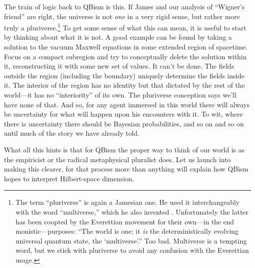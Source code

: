 \documentclass[aps,pra,superscriptaddress,10pt,tightenlines,twocolumn,nofootinbib]{revtex4}
\begin{document}
The train of logic back to QBism is this.  If James and our analysis of ``Wigner's friend'' are right, the universe is not {\it one\/} in a very rigid sense, but rather more truly a pluriverse.\footnote{The term ``pluriverse'' is again a Jamesian one.  He used it interchangeably with the word ``multiverse,'' which he also invented \cite{JamesMultiverse}.  Unfortunately the latter has been coopted by the Everettian movement for their own---in the end monistic---purposes:  ``The world is one; it {\it is\/} the deterministically evolving universal quantum state, the `multiverse'.'' Too bad.  Multiverse is a tempting word, but we stick with pluriverse to avoid any confusion with the Everettian usage.}  To get some sense of what this can mean, it is useful to start by thinking about what it is not.  A good example can be found by taking a solution to the vacuum Maxwell equations in some extended region of spacetime.  Focus on a compact subregion and try to conceptually delete the solution within it, reconstructing it with some new set of values.  It can't be done.  The fields outside the region (including the boundary) uniquely determine the fields inside it.  The interior of the region has no identity but that dictated by the rest of the world---it has no ``interiority'' of its own.  The pluriverse conception says we'll have none of that.  And so, for any agent immersed in this world there will always be uncertainty for what will happen upon his encounters with it.  To wit, where there is uncertainty there should be Bayesian probabilities, and so on and so on until much of the story we have already told.

What all this hints is that for QBism the proper way to think of our world is as the empiricist or the radical metaphysical pluralist does.  Let us launch into making this clearer, for that process more than anything will explain how QBism hopes to interpret Hilbert-space dimension.
\end{document}

